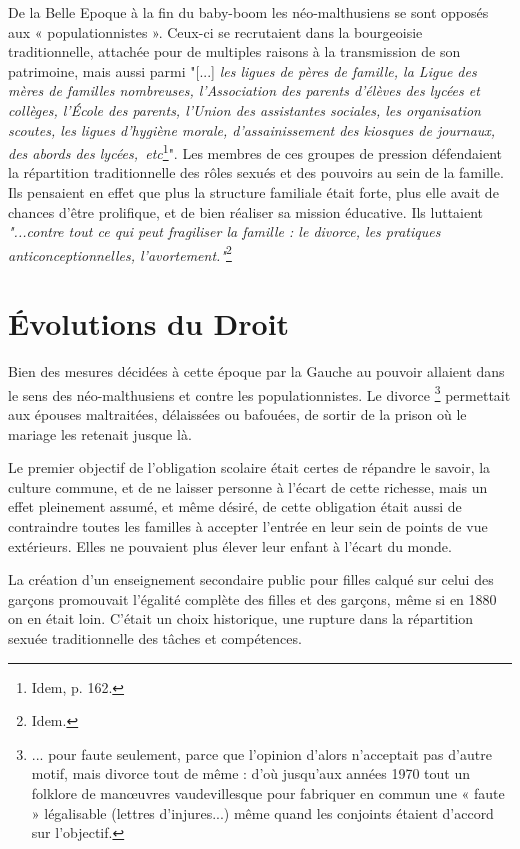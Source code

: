  De la Belle Epoque à la fin du baby-boom les néo-malthusiens se sont opposés aux « populationnistes ». Ceux-ci se recrutaient dans la bourgeoisie traditionnelle, attachée pour de multiples raisons à la transmission de son patrimoine, mais aussi parmi {"[...] \emph{les ligues de pères de famille, la Ligue des mères de familles nombreuses, l'Association des parents d'élèves des lycées et collèges, l'École des parents, l'Union des assistantes sociales, les organisation scoutes, les ligues d'hygiène morale, d'assainissement des kiosques de journaux, des abords des lycées,~etc}\footnote{Idem, p. 162.}".} Les membres de ces groupes de pression défendaient la répartition traditionnelle des rôles sexués et des pouvoirs au sein de la famille. Ils pensaient en effet que plus la structure familiale était forte, plus elle avait de chances d'être prolifique, et de bien réaliser sa mission éducative. Ils luttaient {\emph{"...contre tout ce qui peut fragiliser la famille : le divorce, les pratiques anticonceptionnelles, l'avortement."}\footnote{Idem.}}


\section{Évolutions du Droit}

 Bien des mesures décidées à cette époque par la Gauche au pouvoir allaient dans le sens des néo-malthusiens et contre les populationnistes. Le divorce%
\footnote{... pour faute seulement, parce que l'opinion d'alors n'acceptait pas d'autre motif, mais divorce tout de même : d'où jusqu'aux années 1970 tout un folklore de manœuvres vaudevillesque pour fabriquer en commun une « faute » légalisable (lettres d'injures...) même quand les conjoints étaient d'accord sur l'objectif.} 
permettait aux épouses maltraitées, délaissées ou bafouées, de sortir de la prison où le mariage les retenait jusque là. 

 Le premier objectif de l'obligation scolaire était certes de répandre le savoir, la culture commune, et de ne laisser personne à l'écart de cette richesse, mais un effet pleinement assumé, et même désiré, de cette obligation était aussi de contraindre toutes les familles à accepter l'entrée en leur sein de points de vue extérieurs. Elles ne pouvaient plus élever leur enfant à l'écart du monde. 

 La création d'un enseignement secondaire public pour filles calqué sur celui des garçons promouvait l'égalité complète des filles et des garçons, même si en 1880 on en était loin. C'était un choix historique, une rupture dans la répartition sexuée traditionnelle des tâches et compétences. 

